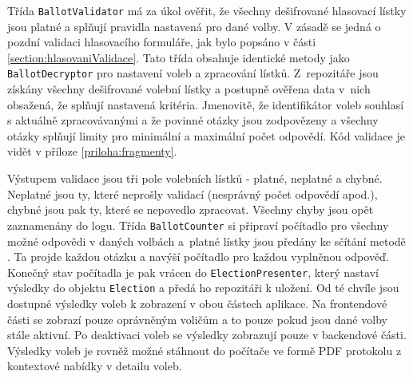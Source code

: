 Třída \texttt{BallotValidator} má za úkol ověřit, že všechny dešifrované hlasovací lístky jsou platné a splňují pravidla nastavená pro dané volby. V zásadě se jedná o pozdní validaci hlasovacího formuláře, jak bylo popsáno v části \ref{section:hlasovaniValidace}. Tato třída obsahuje identické metody jako \texttt{BallotDecryptor} pro nastavení voleb a zpracování lístků. Z~repozitáře jsou získány všechny dešifrované volební lístky a postupně ověřena data v~nich obsažená, že splňují nastavená kritéria. Jmenovitě, že identifikátor voleb souhlasí s aktuálně zpracovávanými a že povinné otázky jsou zodpovězeny a všechny otázky splňují limity pro minimální a maximální počet odpovědí. Kód validace je vidět v příloze \ref{priloha:fragmenty}.

Výstupem validace jsou tři pole volebních lístků - platné, neplatné a chybné. Neplatné jsou ty, které neprošly validací (nesprávný počet odpovědí apod.), chybné jsou pak ty, které se nepovedlo zpracovat. Všechny chyby jsou opět zaznamenány do logu. Třída \texttt{BallotCounter} si připraví počítadlo pro všechny možné odpovědi v daných volbách a~platné lístky jsou předány ke sčítání metodě %
. Ta projde každou otázku a navýší počítadlo pro každou vyplněnou odpověď. Konečný stav počítadla je pak vrácen do \texttt{ElectionPresenter}, který nastaví výsledky do objektu \texttt{Election} a předá ho repozitáři k uložení. Od té chvíle jsou dostupné výsledky voleb k zobrazení v obou částech aplikace. Na frontendové části se zobrazí pouze oprávněným voličům a to pouze pokud jsou dané volby stále aktivní. Po deaktivaci voleb se výsledky zobrazují pouze v backendové části. Výsledky voleb je rovněž možné stáhnout do počítače ve formě PDF protokolu z kontextové nabídky v detailu voleb.

